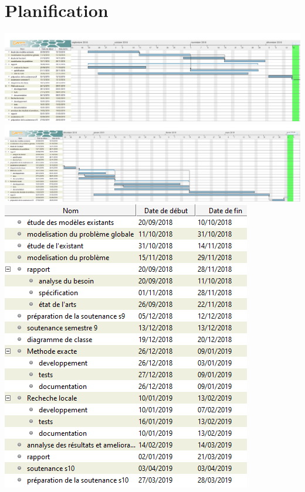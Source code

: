 \chapter{Planification}

\includegraphics[width=\textwidth]{parts/plannification/gantt}
\includegraphics[width=\textwidth]{parts/plannification/gantt_2}
\includegraphics[width=\textwidth]{parts/plannification/gantt_dates}